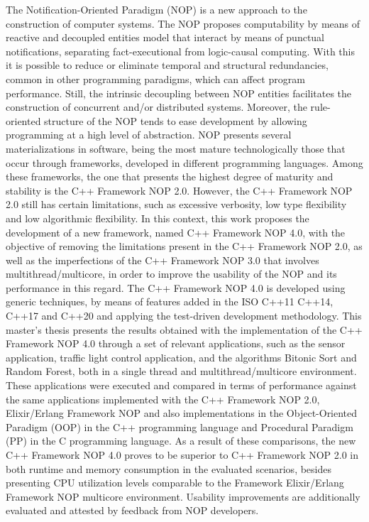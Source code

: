 
\begin{abstractutfpr}%
The Notification-Oriented Paradigm (NOP) is a new approach to the construction
of computer systems. The NOP proposes computability by means of reactive and
decoupled entities model that interact by means of punctual notifications,
separating fact-executional from logic-causal computing. With this it is
possible to reduce or eliminate temporal and structural redundancies, common in
other programming paradigms, which can affect program performance. Still, the
intrinsic decoupling between NOP entities facilitates the construction of
concurrent and/or distributed systems. Moreover, the rule-oriented structure of
the NOP tends to ease development by allowing programming at a high level of
abstraction. NOP presents several materializations in software, being the
most mature technologically those that occur through frameworks, developed in
different programming languages. Among these frameworks, the one that presents
the highest degree of maturity and stability is the C++ Framework NOP 2.0.
However, the C++ Framework NOP 2.0 still has certain limitations, such as
excessive verbosity, low type flexibility and low algorithmic flexibility. In
this context, this work proposes the development of a new framework, named C++
Framework NOP 4.0, with the objective of removing the limitations present in the
C++ Framework NOP 2.0, as well as the imperfections of the C++ Framework NOP 3.0
that involves multithread/multicore, in order to improve the usability of the
NOP and its performance in this regard. The C++ Framework NOP 4.0 is developed
using generic techniques, by means of features added in the ISO C++11 C++14,
C++17 and C++20 and applying the test-driven development methodology. This
master's thesis presents the results obtained with the implementation of the C++
Framework NOP 4.0 through a set of relevant applications, such as the sensor
application, traffic light control application, and the algorithms Bitonic Sort
and Random Forest, both in a single thread and multithread/multicore
environment. These applications were executed and compared in terms of
performance against the same applications implemented with the C++ Framework NOP
2.0, Elixir/Erlang Framework NOP and also implementations in the Object-Oriented
Paradigm (OOP) in the C++ programming language and Procedural Paradigm (PP) in
the C programming language. As a result of these comparisons, the new C++
Framework NOP 4.0 proves to be superior to C++ Framework NOP 2.0 in both runtime
and memory consumption in the evaluated scenarios, besides presenting CPU
utilization levels comparable to the Framework Elixir/Erlang Framework
NOP multicore environment. Usability improvements are additionally
evaluated and attested by feedback from NOP developers.
\end{abstractutfpr}
